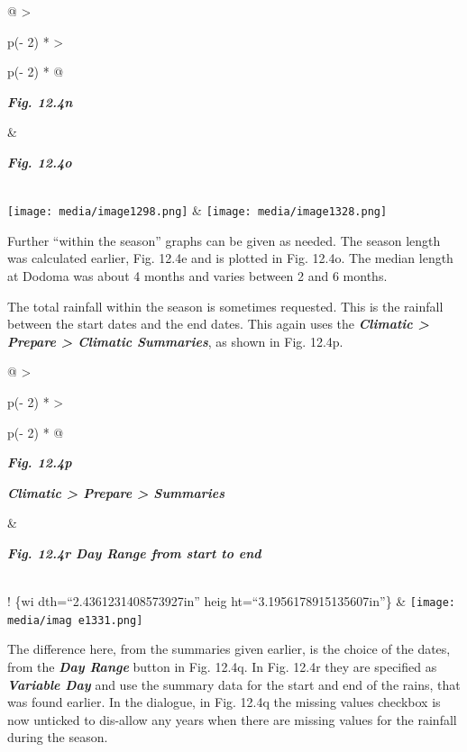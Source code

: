 \documentclass[
  letterpaper,
  DIV=11,
  numbers=noendperiod]{scrreprt}
\begin{document}
\begin{longtable}[]{@{}
  >{\raggedright\arraybackslash}p{(\columnwidth - 2\tabcolsep) * }
  >{\raggedright\arraybackslash}p{(\columnwidth - 2\tabcolsep) * }@{}}
\toprule\noalign{}
\begin{minipage}[b]{\linewidth}\raggedright
\textbf{\emph{Fig. 12.4n}}
\end{minipage} & \begin{minipage}[b]{\linewidth}\raggedright
\textbf{\emph{Fig. 12.4o}}
\end{minipage} \\
\midrule\noalign{}
\endhead
\bottomrule\noalign{}
\endlastfoot
\texttt{[image: media/image1298.png]}
&
\texttt{[image: media/image1328.png]} \\
\end{longtable}

Further ``within the season'' graphs can be given as needed. The season
length was calculated earlier, Fig. 12.4e and is plotted in Fig. 12.4o.
The median length at Dodoma was about 4 months and varies between 2 and
6 months.

The total rainfall within the season is sometimes requested. This is the
rainfall between the start dates and the end dates. This again uses the
\textbf{\emph{Climatic \textgreater{} Prepare \textgreater{} Climatic
Summaries}}, as shown in Fig. 12.4p.

\begin{longtable}[]{@{}
  >{\raggedright\arraybackslash}p{(\columnwidth - 2\tabcolsep) * }
  >{\raggedright\arraybackslash}p{(\columnwidth - 2\tabcolsep) * }@{}}
\toprule\noalign{}
\begin{minipage}[b]{\linewidth}\raggedright
\textbf{\emph{Fig. 12.4p}}

\textbf{\emph{Climatic \textgreater{} Prepare \textgreater{} Summaries}}
\end{minipage} & \begin{minipage}[b]{\linewidth}\raggedright
\textbf{\emph{Fig. 12.4r Day Range from start to end}}
\end{minipage} \\
\midrule\noalign{}
\endhead
\bottomrule\noalign{}
\endlastfoot
! \href{media/image1329.png}{}\{wi dth=``2.4361231408573927in'' heig
ht=``3.1956178915135607in''\} &
\texttt{[image: media/imag e1331.png]} \\
\end{longtable}

The difference here, from the summaries given earlier, is the choice of
the dates, from the \textbf{\emph{Day Range}} button in Fig. 12.4q. In
Fig. 12.4r they are specified as \textbf{\emph{Variable Day}} and use
the summary data for the start and end of the rains, that was found
earlier. In the dialogue, in Fig. 12.4q the missing values checkbox is
now unticked to dis-allow any years when there are missing values for
the rainfall during the season.
\end{document}

